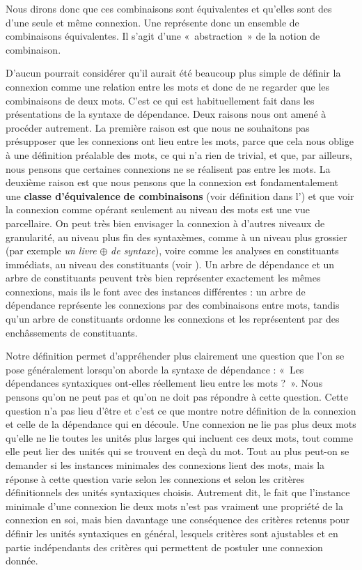 \begin{styleLivreImportant}
Nous dirons donc que ces combinaisons sont équivalentes et qu’elles sont des  d’une seule et même connexion. Une  représente donc un ensemble de combinaisons équivalentes. Il s’agit d’une «~abstraction~» de la notion de combinaison.
\end{styleLivreImportant}

D’aucun pourrait considérer qu’il aurait été beaucoup plus simple de définir la connexion comme une relation entre les mots et donc de ne regarder que les combinaisons de deux mots. C’est ce qui est habituellement fait dans les présentations de la syntaxe de dépendance. Deux raisons nous ont amené à procéder autrement. La première raison est que nous ne souhaitons pas présupposer que les connexions ont lieu entre les mots, parce que cela nous oblige à une définition préalable des mots, ce qui n’a rien de trivial, et que, par ailleurs, nous pensons que certaines connexions ne se réalisent pas entre les mots. La deuxième raison est que nous pensons que la connexion est fondamentalement une \textbf{classe d’équivalence} \textbf{de combinaisons} (voir définition dans l’) et que voir la connexion comme opérant seulement au niveau des mots est une vue parcellaire. On peut très bien envisager la connexion à d’autres niveaux de granularité, au niveau plus fin des syntaxèmes, comme à un niveau plus grossier (par exemple \textit{un livre} ${\oplus}$ \textit{de syntaxe}), voire comme les analyses en constituants immédiats, au niveau des constituants (voir ). Un arbre de dépendance et un arbre de constituants peuvent très bien représenter exactement les mêmes connexions, mais ils le font avec des instances différentes : un arbre de dépendance représente les connexions par des combinaisons entre mots, tandis qu’un arbre de constituants ordonne les connexions et les représentent par des enchâssements de constituants.

Notre définition permet d’appréhender plus clairement une question que l’on se pose généralement lorsqu’on aborde la syntaxe de dépendance : «~Les dépendances syntaxiques ont-elles réellement lieu entre les mots ?~». Nous pensons qu’on ne peut pas et qu’on ne doit pas répondre à cette question. Cette question n’a pas lieu d’être et c’est ce que montre notre définition de la connexion et celle de la dépendance qui en découle. Une connexion ne lie pas plus deux mots qu’elle ne lie toutes les unités plus larges qui incluent ces deux mots, tout comme elle peut lier des unités qui se trouvent en deçà du mot. Tout au plus peut-on se demander si les instances minimales des connexions lient des mots, mais la réponse à cette question varie selon les connexions et selon les critères définitionnels des unités syntaxiques choisis. Autrement dit, le fait que l’instance minimale d’une connexion lie deux mots n’est pas vraiment une propriété de la connexion en soi, mais bien davantage une conséquence des critères retenus pour définir les unités syntaxiques en général, lesquels critères sont ajustables et en partie indépendants des critères qui permettent de postuler une connexion donnée.


